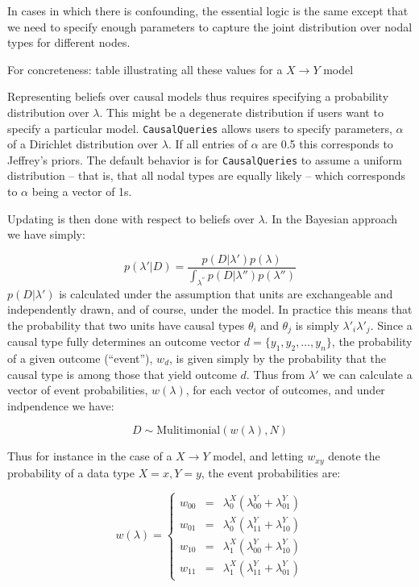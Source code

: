 \documentclass[
  article]{jss}
\begin{document}
In cases in which there is confounding, the essential logic is the same
except that we need to specify enough parameters to capture the joint
distribution over nodal types for different nodes.

For concreteness: table illustrating all these values for a
\(X\rightarrow Y\) model

Representing beliefs over causal models thus requires specifying a
probability distribution over \(\lambda\). This might be a degenerate
distribution if users want to specify a particular model.
\texttt{CausalQueries} allows users to specify parameters, \(\alpha\) of
a Dirichlet distribution over \(\lambda\). If all entries of \(\alpha\)
are 0.5 this corresponds to Jeffrey's priors. The default behavior is
for \texttt{CausalQueries} to assume a uniform distribution -- that is,
that all nodal types are equally likely -- which corresponds to
\(\alpha\) being a vector of 1s.

Updating is then done with respect to beliefs over \(\lambda\). In the
Bayesian approach we have simply:

\[p(\lambda'|D) = \frac{p(D|\lambda')p(\lambda)}{\int_{\lambda^{''}} p(D|\lambda'')p(\lambda'')}\]
\(p(D|\lambda')\) is calculated under the assumption that units are
exchangeable and independently drawn, and of course, under the model. In
practice this means that the probability that two units have causal
types \(\theta_i\) and \(\theta_j\) is simply \(\lambda'_i\lambda'_j\).
Since a causal type fully determines an outcome vector
\(d = \{y_1, y_2,\dots,y_n\}\), the probability of a given outcome
(``event''), \(w_d\), is given simply by the probability that the causal
type is among those that yield outcome \(d\). Thus from \(\lambda'\) we
can calculate a vector of event probabilities, \(w(\lambda)\), for each
vector of outcomes, and under indpendence we have:

\[D \sim \text{Mulitimonial}(w(\lambda), N)\]

Thus for instance in the case of a \(X \rightarrow Y\) model, and
letting \(w_{xy}\) denote the probability of a data type \(X=x, Y=y\),
the event probabilities are:

\[w(\lambda) = \left\{\begin{array}{ccc} w_{00} & = & \lambda^X_0(\lambda^Y_{00} + \lambda^Y_{01})\\ 
w_{01} & = & \lambda^X_0(\lambda^Y_{11} + \lambda^Y_{10})\\
w_{10} & = & \lambda^X_1(\lambda^Y_{00} + \lambda^Y_{10})\\
w_{11} & = & \lambda^X_1(\lambda^Y_{11} + \lambda^Y_{01})\end{array} \right.\]
\end{document}
